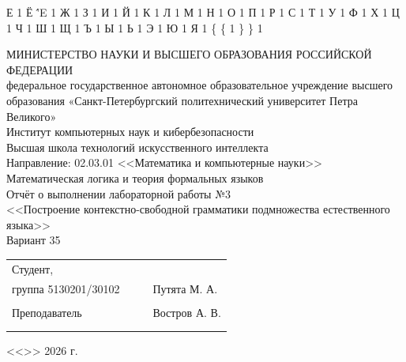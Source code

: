 \documentclass[a4paper,final]{article}
\begin{document}
{  {Е}{ {\selectfont{}} }1
  {Ё}{ {\''E} }1
  {Ж}{ {\selectfont{}} }1
  {З}{ {\selectfont{}} }1
  {И}{ {\selectfont{}} }1
  {Й}{ {\selectfont{}} }1
  {К}{ {\selectfont{}} }1
  {Л}{ {\selectfont{}} }1
  {М}{ {\selectfont{}} }1
  {Н}{ {\selectfont{}} }1
  {О}{ {\selectfont{}} }1
  {П}{ {\selectfont{}} }1
  {Р}{ {\selectfont{}} }1
  {С}{ {\selectfont{}} }1
  {Т}{ {\selectfont{}} }1
  {У}{ {\selectfont{}} }1
  {Ф}{ {\selectfont{}} }1
  {Х}{ {\selectfont{}} }1
  {Ц}{ {\selectfont{}} }1
  {Ч}{ {\selectfont{}} }1
  {Ш}{ {\selectfont{}} }1
  {Щ}{ {\selectfont{}} }1
  {Ъ}{ {\selectfont{}} }1
  {Ы}{ {\selectfont{}} }1
  {Ь}{ {\selectfont{}} }1
  {Э}{ {\selectfont{}} }1
  {Ю}{ {\selectfont{}} }1
  {Я}{ {\selectfont{}} }1
  {\{}{ { {\color{brackets}\{} } }1 %
  {\} }{ { {\color{brackets}\} } } }1 %
}


\thispagestyle{empty}
\begin{center}
\hfill \break
\hfill \break
\normalsize{МИНИСТЕРСТВО НАУКИ И ВЫСШЕГО ОБРАЗОВАНИЯ РОССИЙСКОЙ ФЕДЕРАЦИИ\\
 федеральное государственное автономное образовательное учреждение высшего образования «Санкт-Петербургский политехнический университет Петра Великого»\\[10pt]}
\normalsize{Институт компьютерных наук и кибербезопасности}\\[10pt] 
\normalsize{Высшая школа технологий искусственного интеллекта}\\[10pt] 
\normalsize{Направление: 02.03.01 <<Математика и компьютерные науки>>}\\
\vspace{50pt}
{\large Математическая логика и теория формальных языков\\
Отчёт о выполнении лабораторной работы №3 \\
<<Построение контекстно-свободной грамматики подмножества естественного языка>>\\[1em]
Вариант 35}
\end{center}
 \vspace{70pt}
\small{ 
\begin{tabular}{lrrl}
\!\!\!Студент, & \hspace{2cm} & & \\
\!\!\!группа 5130201/30102 & \hspace{2cm} & \underline{\hspace{3cm}} & Путята М. А.  \\\\
\!\!\!Преподаватель & \hspace{2cm} & \underline{\hspace{3cm}} &  Востров А. В. \\\\
&&\hspace{5cm}
\end{tabular}
\begin{flushright}
<<\underline{\hspace{1cm}}>>\underline{\hspace{2.5cm}} 2026 г.
\end{flushright}
}
\end{document}

